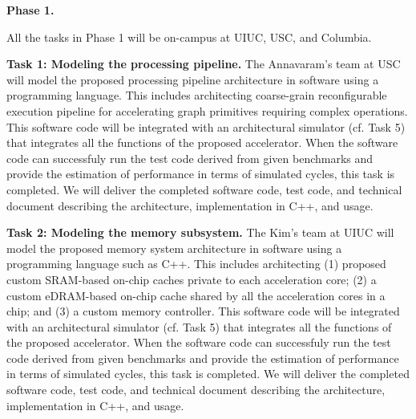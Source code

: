 
\noindent
\textbf{Phase 1.}

\noindent
All the tasks in Phase 1 will be on-campus at UIUC, USC, and Columbia.

\noindent
\textbf{Task 1: Modeling the processing pipeline.} 
The Annavaram's team at USC will model the proposed processing pipeline architecture in software using a programming language.
This includes architecting coarse-grain reconfigurable execution pipeline for accelerating graph primitives requiring complex operations.
This software code will be integrated with an architectural simulator (cf. Task 5) that integrates all the functions of the proposed accelerator.
When the software code can successfuly run the test code derived from given benchmarks and provide the estimation of performance in terms of simulated cycles, this task is completed.
We will deliver the completed software code, test code, and technical document describing the architecture, implementation in C++, and usage.

\noindent
\textbf{Task 2: Modeling the memory subsystem.}
The Kim's team at UIUC will model the proposed memory system architecture in software using a programming language such as C++.
This includes architecting (1) proposed custom SRAM-based on-chip caches private to each acceleration core; (2) a custom eDRAM-based on-chip cache shared by all the acceleration cores in a chip; and (3) a custom memory controller.
This software code will be integrated with an architectural simulator (cf. Task 5) that integrates all the functions of the proposed accelerator.
When the software code can successfuly run the test code derived from given benchmarks and provide the estimation of performance in terms of simulated cycles, this task is completed.
We will deliver the completed software code, test code, and technical document describing the architecture, implementation in C++, and usage.

